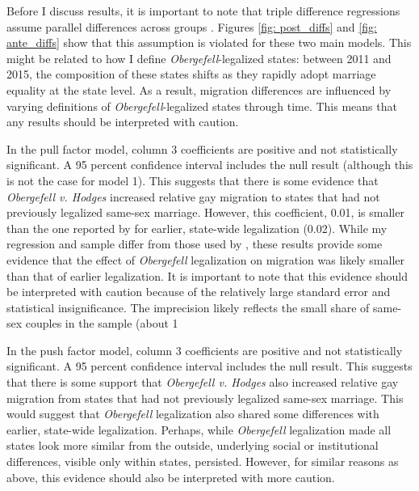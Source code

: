 \documentclass[12pt,letterpaper]{article}
\begin{document}
Before I discuss results, it is important to note that triple difference regressions assume parallel differences across groups \citep{23, 24, 25}. Figures \ref{fig: post_diffs} and \ref{fig: ante_diffs} show that this assumption is violated for these two main models. This might be related to how I define \textit{Obergefell}-legalized states: between 2011 and 2015, the composition of these states shifts as they rapidly adopt marriage equality at the state level. As a result, migration differences are influenced by varying definitions of \textit{Obergefell}-legalized states through time. This means that any results should be interpreted with caution.

\begin{table}[htbp]
    \centering
    \caption{Main Pull Factor Model}
    \label{tab: expost_model}
    
\end{table}
\begin{table}[htbp]
    \centering
    \caption{Main Push Factor Model}
    \label{tab: exante_model}
    
\end{table}

In the pull factor model, column 3 coefficients are positive and not statistically significant. A 95 percent confidence interval includes the null result (although this is not the case for model 1). This suggests that there is some evidence that \textit{Obergefell v. Hodges} increased relative gay migration to states that had not previously legalized same-sex marriage. However, this coefficient, 0.01, is smaller than the one reported by \citet{1} for earlier, state-wide legalization (0.02). While my regression and sample differ from those used by \citet{1}, these results provide some evidence that the effect of \textit{Obergefell} legalization on migration was likely smaller than that of earlier legalization. It is important to note that this evidence should be interpreted with caution because of the relatively large standard error and statistical insignificance. The imprecision likely reflects the small share of same-sex couples in the sample (about 1%

In the push factor model, column 3 coefficients are positive and not statistically significant. A 95 percent confidence interval includes the null result. This suggests that there is some support that \textit{Obergefell v. Hodges} also increased relative gay migration from states that had not previously legalized same-sex marriage. This would suggest that \textit{Obergefell} legalization also shared some differences with earlier, state-wide legalization. Perhaps, while \textit{Obergefell} legalization made all states look more similar from the outside, underlying social or institutional differences, visible only within states, persisted. However, for similar reasons as above, this evidence should also be interpreted with more caution.
\end{document}
